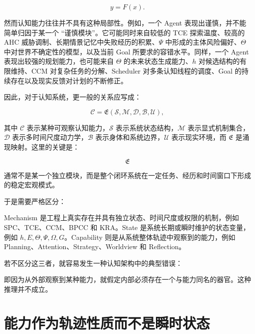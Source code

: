 \[
y = F(x).
\]

然而认知能力往往并不具有这种局部性。例如，一个 Agent 表现出谨慎，并不能简单归因于某一个 ``谨慎模块''。它可能同时来自较低的 TCE 探索温度、较高的 AHC 威胁调制、长期情景记忆中失败经历的积累、$\Psi$ 中形成的主体风险偏好、$\Theta$ 中对世界不确定性的模型，以及当前 Goal 所要求的容错水平。同样，一个 Agent 表现出较强的规划能力，也可能来自 $\Theta$ 的未来状态生成能力、$h$ 对候选结构的有限维持、CCM 对复杂任务的分解、Scheduler 对多条认知线程的调度、Goal 的持续存在以及现实反馈对计划的不断修正。

因此，对于认知系统，更一般的关系应写成：

\[
\boxed{
\mathcal{C}
=
\mathfrak{E}
\left(
\mathcal{S},
\mathcal{M},
\mathcal{D},
\mathcal{B},
\mathcal{U}
\right),
}
\]

其中 $\mathcal{C}$ 表示某种可观察认知能力，$\mathcal{S}$ 表示系统状态结构，$\mathcal{M}$ 表示显式机制集合，$\mathcal{D}$ 表示多时间尺度动力学，$\mathcal{B}$ 表示身体和系统边界，$\mathcal{U}$ 表示现实环境，而 $\mathfrak{E}$ 是涌现映射。这里的关键是：

\[
\mathfrak{E}
\]

通常不是某一个独立模块，而是整个闭环系统在一定任务、经历和时间窗口下形成的稳定宏观模式。

于是需要严格区分：

\begin{statementbox}
\centering
{}
\end{statementbox}

Mechanism 是工程上真实存在并具有独立状态、时间尺度或权限的机制，例如 SPC、TCE、CCM、BPCC 和 KRA。State 是系统长期或瞬时维护的状态变量，例如 $h,E,\Theta,\Psi,\Omega,G$。Capability 则是从系统整体轨迹中观察到的能力，例如 Planning、Attention、Strategy、Worldview 和 Reflection。

若不区分这三者，就容易发生一种认知架构中的典型错误：

\begin{statementbox}
\centering
{}
\end{statementbox}

即因为从外部观察到某种能力，就假定内部必须存在一个与能力同名的器官。这种推理并不成立。

\section{能力作为轨迹性质而不是瞬时状态}

